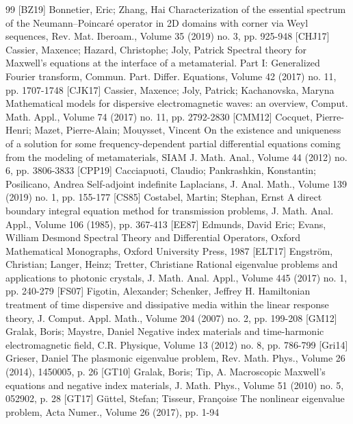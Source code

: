 \begin{thebibliography}{99}
 [BZ19] Bonnetier, Eric; Zhang, Hai Characterization of the essential spectrum of the Neumann–Poincaré operator in 2D domains with corner via Weyl sequences, Rev. Mat. Iberoam., Volume 35 (2019) no. 3, pp. 925-948
 [CHJ17] Cassier, Maxence; Hazard, Christophe; Joly, Patrick Spectral theory for Maxwell’s equations at the interface of a metamaterial. Part I: Generalized Fourier transform, Commun. Part. Differ. Equations, Volume 42 (2017) no. 11, pp. 1707-1748
 [CJK17] Cassier, Maxence; Joly, Patrick; Kachanovska, Maryna Mathematical models for dispersive electromagnetic waves: an overview, Comput. Math. Appl., Volume 74 (2017) no. 11, pp. 2792-2830
 [CMM12] Cocquet, Pierre-Henri; Mazet, Pierre-Alain; Mouysset, Vincent On the existence and uniqueness of a solution for some frequency-dependent partial differential equations coming from the modeling of metamaterials, SIAM J. Math. Anal., Volume 44 (2012) no. 6, pp. 3806-3833
 [CPP19] Cacciapuoti, Claudio; Pankrashkin, Konstantin; Posilicano, Andrea Self-adjoint indefinite Laplacians, J. Anal. Math., Volume 139 (2019) no. 1, pp. 155-177
 [CS85] Costabel, Martin; Stephan, Ernst A direct boundary integral equation method for transmission problems, J. Math. Anal. Appl., Volume 106 (1985), pp. 367-413
 [EE87] Edmunds, David Eric; Evans, William Desmond Spectral Theory and Differential Operators, Oxford Mathematical Monographs, Oxford University Press, 1987
 [ELT17] Engström, Christian; Langer, Heinz; Tretter, Christiane Rational eigenvalue problems and applications to photonic crystals, J. Math. Anal. Appl., Volume 445 (2017) no. 1, pp. 240-279
 [FS07] Figotin, Alexander; Schenker, Jeffrey H. Hamiltonian treatment of time dispersive and dissipative media within the linear response theory, J. Comput. Appl. Math., Volume 204 (2007) no. 2, pp. 199-208
 [GM12] Gralak, Boris; Maystre, Daniel Negative index materials and time-harmonic electromagnetic field, C.R. Physique, Volume 13 (2012) no. 8, pp. 786-799
 [Gri14] Grieser, Daniel The plasmonic eigenvalue problem, Rev. Math. Phys., Volume 26 (2014), 1450005, p. 26
 [GT10] Gralak, Boris; Tip, A. Macroscopic Maxwell’s equations and negative index materials, J. Math. Phys., Volume 51 (2010) no. 5, 052902, p. 28
 [GT17] Güttel, Stefan; Tisseur, Françoise The nonlinear eigenvalue problem, Acta Numer., Volume 26 (2017), pp. 1-94

\end{thebibliography}
